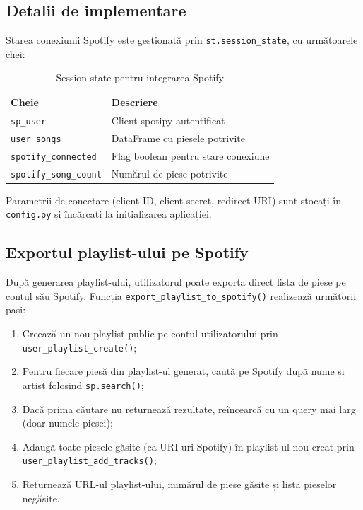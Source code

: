 \documentclass[12pt,a4paper]{article}
\begin{document}
\subsection{Detalii de implementare}

Starea conexiunii Spotify este gestionată prin \texttt{st.session\_state}, cu următoarele chei:

\begin{table}[H]
\centering
\caption{Session state pentru integrarea Spotify}
\label{tab:spotify_state}
\begin{tabular}{ll}
\toprule
\textbf{Cheie} & \textbf{Descriere} \\
\midrule
\texttt{sp\_user}            & Client spotipy autentificat \\
\texttt{user\_songs}         & DataFrame cu piesele potrivite \\
\texttt{spotify\_connected}  & Flag boolean pentru stare conexiune \\
\texttt{spotify\_song\_count} & Numărul de piese potrivite \\
\bottomrule
\end{tabular}
\end{table}

Parametrii de conectare (client ID, client secret, redirect URI) sunt stocați în \texttt{config.py} și încărcați la inițializarea aplicației.

\subsection{Exportul playlist-ului pe Spotify}

După generarea playlist-ului, utilizatorul poate exporta direct lista de piese pe contul său Spotify. Funcția \texttt{export\_playlist\_to\_spotify()} realizează următorii pași:

\begin{enumerate}
    \item Creează un nou playlist public pe contul utilizatorului prin \texttt{user\_playlist\_create()};
    \item Pentru fiecare piesă din playlist-ul generat, caută pe Spotify după nume și artist folosind \texttt{sp.search()};
    \item Dacă prima căutare nu returnează rezultate, reîncearcă cu un query mai larg (doar numele piesei);
    \item Adaugă toate piesele găsite (ca URI-uri Spotify) în playlist-ul nou creat prin \texttt{user\_playlist\_add\_tracks()};
    \item Returnează URL-ul playlist-ului, numărul de piese găsite și lista pieselor negăsite.
\end{enumerate}
\end{document}
